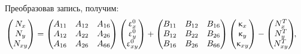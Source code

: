 Преобразовав запись, получим:
\begin{equation}\label{eq:N_matrix}%
\hspace{-1em}%
    \begin{pmatrix}
    N_{x}\\
    N_{y}\\
    N_{xy}
    \end{pmatrix}
    =
    \begin{pmatrix}
    A_{11} & A_{12} & A_{16}\\
    A_{12} & A_{22} & A_{26}\\
    A_{16} & A_{26} & A_{66}
    \end{pmatrix}
    \begin{pmatrix}
    \epsilon_{x}^0\\
    \epsilon_{y}^0\\
    \epsilon_{xy}^0
    \end{pmatrix}
    +
    \begin{pmatrix}
    B_{11} & B_{12} & B_{16}\\
    B_{12} & B_{22} & B_{26}\\
    B_{16} & B_{26} & B_{66}
    \end{pmatrix}
    \begin{pmatrix}
    \kappa_{x}\\
    \kappa_{y}\\
    \kappa_{xy}
    \end{pmatrix}
    -
    \begin{pmatrix}
    N_{x}^T\\
    N_{y}^T\\
    N_{xy}^T
    \end{pmatrix}\!\!,%
\end{equation}%
